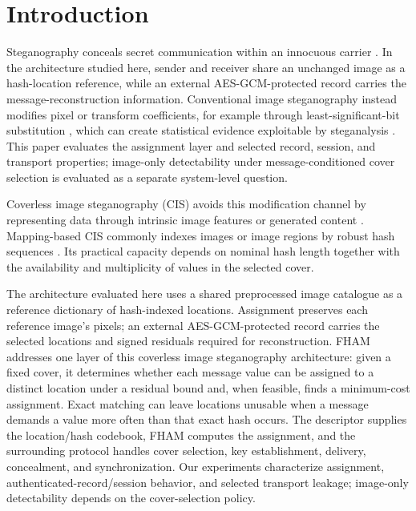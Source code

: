 \documentclass[preprint,12pt]{elsarticle}
\theoremstyle{plain}
\begin{document}
\section{Introduction}
Steganography conceals secret communication within an innocuous carrier \cite{johnson1998exploring}. In the architecture studied here, sender and receiver share an unchanged image as a hash-location reference, while an external AES-GCM-protected record carries the message-reconstruction information. Conventional image steganography instead modifies pixel or transform coefficients, for example through least-significant-bit substitution \cite{chan2004hiding}, which can create statistical evidence exploitable by steganalysis \cite{fridrich2012rich,xu2016structural}. This paper evaluates the assignment layer and selected record, session, and transport properties; image-only detectability under message-conditioned cover selection is evaluated as a separate system-level question.

Coverless image steganography (CIS) avoids this modification channel by representing data through intrinsic image features or generated content \cite{zhou2015coverless,qin2020gan,tan2024review}. Mapping-based CIS commonly indexes images or image regions by robust hash sequences \cite{zheng2018coverless}. Its practical capacity depends on nominal hash length together with the availability and multiplicity of values in the selected cover.

The architecture evaluated here uses a shared preprocessed image catalogue as a reference dictionary of hash-indexed locations. Assignment preserves each reference image's pixels; an external AES-GCM-protected record carries the selected locations and signed residuals required for reconstruction. FHAM addresses one layer of this coverless image steganography architecture: given a fixed cover, it determines whether each message value can be assigned to a distinct location under a residual bound and, when feasible, finds a minimum-cost assignment. Exact matching can leave locations unusable when a message demands a value more often than that exact hash occurs. The descriptor supplies the location/hash codebook, FHAM computes the assignment, and the surrounding protocol handles cover selection, key establishment, delivery, concealment, and synchronization. Our experiments characterize assignment, authenticated-record/session behavior, and selected transport leakage; image-only detectability depends on the cover-selection policy.
\end{document}
